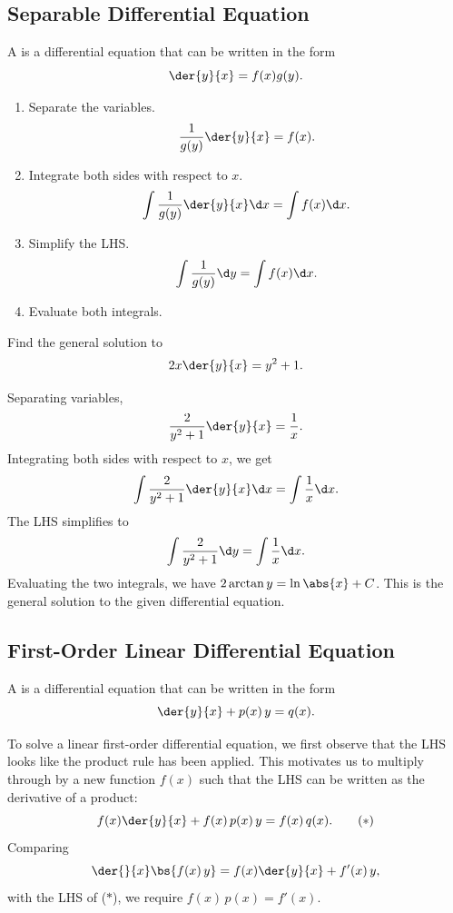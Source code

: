 \subsection{Separable Differential Equation}

\begin{definition}
    A  is a differential equation that can be written in the form \[\der{y}{x} = f(x) g(y).\]
\end{definition}

\begin{recipe}
    \phantom{.}
    \begin{enumerate}
        \item Separate the variables. \[\frac1{g(y)} \der{y}{x} = f(x).\]
        \item Integrate both sides with respect to $x$. \[\int \frac1{g(y)} \der{y}{x} \d x = \int f(x) \d x.\]
        \item Simplify the LHS. \[\int \frac1{g(y)} \d y = \int f(x) \d x.\]
        \item Evaluate both integrals.
    \end{enumerate}
\end{recipe}

\begin{sample}
    Find the general solution to \[2x \der{y}{x} = y^2 + 1.\]
\end{sample}
\begin{sampans}
    Separating variables, \[\frac2{y^2 + 1} \der{y}{x} = \frac1{x}.\] Integrating both sides with respect to $x$, we get \[\int \frac2{y^2 + 1} \der{y}{x} \d x = \int \frac1{x} \d x.\] The LHS simplifies to \[\int \frac2{y^2 + 1} \d y = \int \frac1{x} \d x.\] Evaluating the two integrals, we have $2\arctan y = \ln \abs{x} + C$. This is the general solution to the given differential equation.
\end{sampans}

\subsection{First-Order Linear Differential Equation}

\begin{definition}
    A  is a differential equation that can be written in the form \[\der{y}{x} + p(x) \, y = q(x).\]
\end{definition}

To solve a linear first-order differential equation, we first observe that the LHS looks like the product rule has been applied. This motivates us to multiply through by a new function $f(x)$ such that the LHS can be written as the derivative of a product: \[f(x) \der{y}{x} + f(x) \, p(x) \, y = f(x) \, q(x). \tag{$\ast$}\] Comparing \[\der{}{x} \bs{f(x) \, y} = f(x) \der{y}{x} + f'(x) \, y,\] with the LHS of ($\ast$), we require $f(x) \, p(x) = f'(x)$.

